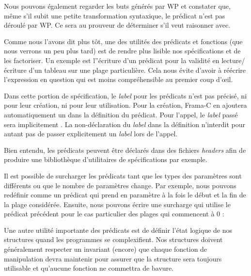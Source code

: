 


Nous pouvons également regarder les buts générés par WP et constater que,
même s'il subit une petite transformation syntaxique, le prédicat n'est pas
déroulé par WP. Ce sera au prouveur de déterminer s'il veut raisonner avec.




Comme nous l'avons dit plus tôt, une des utilités des prédicats et fonctions (que
nous verrons un peu plus tard) est de rendre plus lisible nos spécifications et
de les factoriser. Un exemple est l''écriture d'un prédicat pour la validité en
lecture/écriture d'un tableau sur une plage particulière. Cela nous évite d'avoir
à réécrire l'expression en question qui est moins compréhensible au premier
coup d’œil.






Dans cette portion de spécification, le \textit{label} pour les prédicats n'est pas
précisé, ni pour leur création, ni pour leur utilisation. Pour la création,
Frama-C en ajoutera automatiquement un dans la définition du prédicat.
Pour l'appel, le \textit{label} passé sera implicitement . La non-déclaration
du \textit{label} dans la définition n'interdit pour autant pas de passer explicitement
un \textit{label} lors de l'appel.



Bien entendu, les prédicats peuvent être déclarés dans des fichiers \textit{headers} afin
de produire une bibliothèque d'utilitaires de spécifications par exemple.



Il est possible de surcharger les prédicats tant que les types des paramètres
sont différents ou que le nombre de paramètres change. Par exemple, nous
pouvons redéfinir  comme un prédicat qui prend
en paramètre à la fois le début et la fin de la plage considérée. Ensuite,
nous pouvons écrire une surcharge qui utilise le prédicat précédent pour le
cas particulier des plages qui commencent à 0 :







Une autre utilité importante des prédicats est de définir l'état logique de nos
structures quand les programmes se complexifient. Nos structures doivent
généralement respecter un invariant (encore) que chaque fonction de manipulation
devra maintenir pour assurer que la structure sera toujours utilisable et
qu'aucune fonction ne commettra de bavure.



